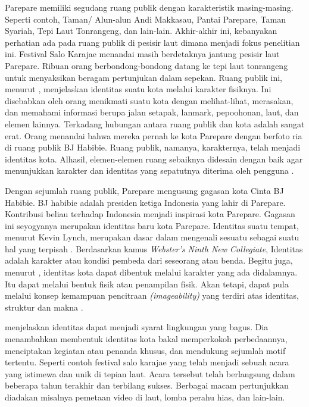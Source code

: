 \documentclass[12pt]{simart} %
\begin{document}
Parepare memiliki segudang ruang publik dengan karakteristik masing-masing. Seperti contoh, Taman/ Alun-alun Andi Makkasau, Pantai Parepare, Taman Syariah, Tepi Laut Tonrangeng, dan lain-lain.
Akhir-akhir ini, kebanyakan perhatian ada pada ruang publik di pesisir laut dimana menjadi fokus penelitian ini.
Festival Salo Karajae menandai masih berdetaknya jantung pesisir laut Parepare. Ribuan orang berbondong-bondong datang ke tepi laut tonrangeng untuk menyaksikan beragam pertunjukan dalam sepekan.
Ruang publik ini, menurut \cite{hartanti2014},   menjelaskan identitas suatu kota melalui karakter fisiknya.
Ini disebabkan oleh orang menikmati suatu kota dengan melihat-lihat, merasakan, dan memahami informasi berupa jalan setapak, lanmark, pepoohonan, laut, dan elemen lainnya.
Terkadang hubungan antara ruang publik dan kota adalah sangat erat. Orang menandai bahwa mereka pernah ke kota Parepare dengan berfoto ria di ruang publik BJ Habibie. Ruang publik, namanya, karakternya, telah menjadi identitas kota. Alhasil, elemen-elemen ruang sebaiknya didesain dengan baik agar menunjukkan karakter dan identitas yang sepatutnya diterima oleh pengguna \citep{hartanti2014}.

Dengan sejumlah ruang publik, Parepare mengusung gagasan kota Cinta BJ Habibie. BJ habibie adalah presiden ketiga Indonesia yang lahir di Parepare.
Kontribusi beliau terhadap Indonesia menjadi inspirasi kota Parepare. Gagasan ini seyogyanya merupakan identitas baru kota Parepare.
Identitas suatu tempat, menurut Kevin Lynch, merupakan dasar dalam mengenali sesuatu sebagai suatu hal yang terpisah \citep{hartanti2014}. Berdasarkan kamus \textit{Webster's Ninth New Collegiate}, Identitas adalah karakter atau kondisi pembeda dari seseorang atau benda.
Begitu juga, menurut \cite{hartanti2014}, identitas kota dapat dibentuk melalui karakter yang ada didalamnya. Itu dapat melalui bentuk fisik atau penampilan fisik. Akan tetapi, dapat pula melalui konsep kemampuan pencitraan \textit{(imageability)} yang terdiri atas identitas, struktur dan makna \citep{lynch1984}.

\cite{hartanti2014} menjelaskan identitas dapat menjadi syarat lingkungan yang bagus. Dia menambahkan membentuk identitas kota bakal memperkokoh perbedaannya, menciptakan kegiatan atau penanda khusus, dan mendukung sejumlah motif tertentu. Seperti contoh festival salo karajae yang telah menjadi sebuah acara yang istimewa dan unik di tepian laut. Acara tersebut telah berlangsung dalam beberapa tahun terakhir dan terbilang sukses. Berbagai macam pertunjukkan diadakan misalnya pemetaan video di laut, lomba perahu hias, dan lain-lain.
\end{document}
